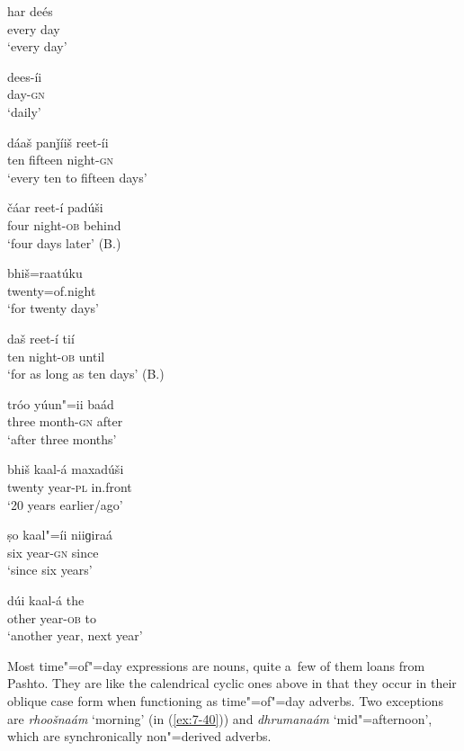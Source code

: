\begin{exe}
\ex
\label{ex:7-30}
\gll har deés  \\
every day \\
\glt `every day' 

\ex
\label{ex:7-31}
\gll dees-íi \\
day-\textsc{gn} \\
\glt `daily' 

\ex
\label{ex:7-32}
\gll dáaš panǰíiš reet-íi \\
ten fifteen night-\textsc{gn} \\
\glt `every ten to fifteen days'

\ex
\label{ex:7-33}
\gll čáar reet-í padúši \\
four night-\textsc{ob} behind  \\
\glt `four days later' (B.)

\ex
\label{ex:7-34}
\gll bhiš=raatúku\\
twenty=of.night    \\
\glt `for twenty days'

\ex
\label{ex:7-35}
\gll daš reet-í tií \\
ten night-\textsc{ob} until  \\
\glt `for as long as ten days' (B.)

\ex
\label{ex:7-36}
\gll tróo yúun"=ii baád \\
three month-\textsc{gn} after \\
\glt `after three months'

\ex
\label{ex:7-37}
\gll bhiš kaal-á maxadúši \\
twenty year-\textsc{pl} in.front  \\
\glt `20 years earlier/ago'

\ex
\label{ex:7-38}
\gll ṣo kaal"=íi niiɡiraá \\
six year-\textsc{gn} since  \\
\glt `since six years'

\ex
\label{ex:7-39}
\gll dúi kaal-á the \\
other year-\textsc{ob} to \\
\glt `another year, next year'
\end{exe}

Most time"=of"=day expressions are nouns, quite a~few of them loans from Pashto. They are like the
calendrical cyclic ones above in that they occur in their oblique case form when functioning as
time"=of"=day adverbs. Two exceptions are \textit{rhoošnaám} `morning' (in (\ref{ex:7-40})) and
\textit{dhrumanaám} `mid"=afternoon', which are synchronically non"=derived adverbs.

